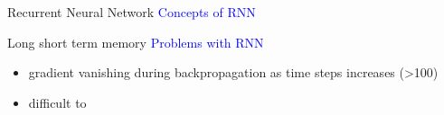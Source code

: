 		\begin{frame}[t]{Recurrent Neural Network}
			\textcolor{blue}{\Large Concepts of RNN}
			\begin{minipage}[t]{0.48\linewidth}
			\end{minipage}\hfill
			\begin{minipage}[t]{0.48\linewidth}
			\end{minipage}

		\end{frame}
		
		\begin{frame}[t]{Long short term memory}
		\textcolor{blue}{\Large Problems with RNN}
			\begin{itemize}[<+->]
			 \item gradient vanishing during backpropagation as time steps increases (>100)
			 \item difficult to 
			\end{itemize}

		\end{frame}



